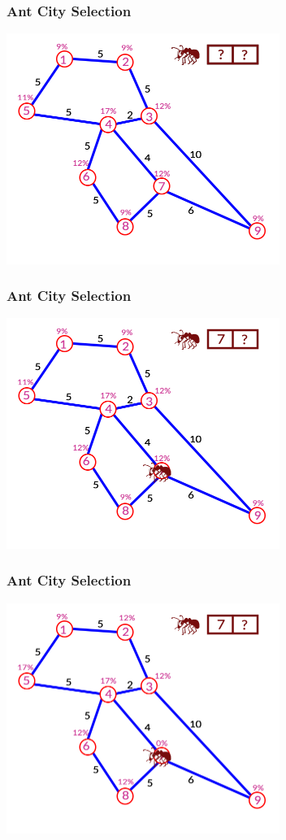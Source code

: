 \documentclass[12pt]{beamer}
\begin{document}
\begin{frame}
\frametitle{Ant City Selection}
\begin{center}
\includegraphics[height=75mm]{Images/antred1}\\
\end{center}
\end{frame}
\begin{frame}
\frametitle{Ant City Selection}
\begin{center}
\includegraphics[height=75mm]{Images/antred2}\\
\end{center}
\end{frame}
\begin{frame}
\frametitle{Ant City Selection}
\begin{center}
\includegraphics[height=75mm]{Images/antred3}\\
\end{center}
\end{frame}
\end{document}
